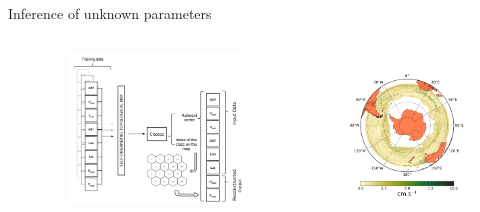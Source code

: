 \documentclass[handout]{beamer}
\newcommand{\rref}[1][]{\hfill{\scriptsize\textit{#1}}}
\begin{document}
    \begin{frame}{Inference of unknown parameters}
        \begin{columns}
                \rref[\cite{Chapman2017ReconstructionMaps}]

         \begin{figure}
         \includegraphics[width=\textwidth]{fig/L3/Method_Schematic_Modified.pdf}
    \end{figure}
    \pause
         \begin{figure}
         \includegraphics[width=\textwidth]{fig/L3/Deep_Mean_2009_Recon_resized_crop.png}\\

\end{figure}
\end{columns}
\end{frame}
\end{document}
